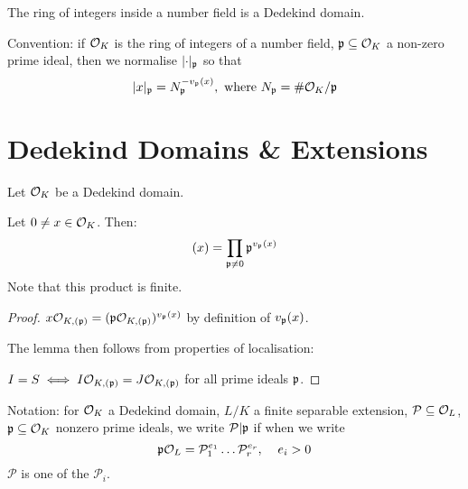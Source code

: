 \documentclass[10pt,a4paper]{article}
\begin{document}
\begin{corollary}
  The ring of integers inside a number field is a Dedekind domain.
\end{corollary}
Convention: if $\mathcal{O}_K$ is the ring of integers of a number field, $\mathfrak{p} \subseteq \mathcal{O}_K$ a non-zero prime ideal, then we normalise $\lvert\cdot\rvert_{\mathfrak{p}}$ so that
\[\lvert x\rvert_{\mathfrak{p}} = N_{\mathfrak{p}}^{-v_{\mathfrak{p}}(x)}, \text{ where } N_{\mathfrak{p}} = \#\mathcal{O}_K/\mathfrak{p}\]

\section{Dedekind Domains \& Extensions}
Let $\mathcal{O}_K$ be a Dedekind domain.
\begin{lemma}
  Let $0 \neq x \in \mathcal{O}_K$. Then:
  \[(x) = \prod_{\mathfrak{p}\neq 0}\mathfrak{p}^{v_{\mathfrak{p}}(x)}\]
  Note that this product is finite.
\end{lemma}
\begin{proof}
  $x \mathcal{O}_{K, (\mathfrak{p})} = (\mathfrak{p}\mathcal{O}_{K, (\mathfrak{p})})^{v_{\mathfrak{p}}(x)}$ by definition of $v_{\mathfrak{p}}(x)$.

  The lemma then follows from properties of localisation:

  $I = S \iff I \mathcal{O}_{K, (\mathfrak{p})} = J \mathcal{O}_{K, (\mathfrak{p})}$ for all prime ideals $\mathfrak{p}$.
\end{proof}
Notation: for $\mathcal{O}_K$ a Dedekind domain, $L/K$ a finite separable extension, $\mathcal{P} \subseteq \mathcal{O}_L$, $\mathfrak{p} \subseteq \mathcal{O}_K$ nonzero prime ideals, we write $\mathcal{P} | \mathfrak{p}$ if when we write
\[\mathfrak{p}\mathcal{O}_L = \mathcal{P}_1^{e_1}\ldots \mathcal{P}_r^{e_r}, \;\;\;\; e_i >0\]
$\mathcal{P}$ is one of the $\mathcal{P}_i$.
\end{document}
